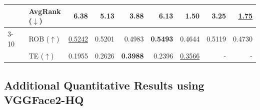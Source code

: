 \documentclass{article}
\begin{document}
\begin{table}[h!]
\begin{tabular}{lllrrrrrrr}
& & AvgRank ($\downarrow$) & 6.38 & 5.13 & 3.88 & 6.13 & \textbf{1.50} & 3.25 & \underline{1.75} \\

\cmidrule(lr){3-10}

& & ROB ($\uparrow$) & \underline{0.5242} & 0.5201 & 0.4983 & \textbf{0.5493} & 0.4644 & 0.5119 & 0.4730 \\
& & TE ($\uparrow$) & 0.1955 & 0.2626 & \textbf{0.3988} & 0.2396 & \underline{0.3566} & - & -\\
\bottomrule
\end{tabular}
\vspace{-10pt}
\end{table}

\clearpage

\subsection{Additional Quantitative Results using VGGFace2-HQ}
\label{appendix:vggface}
\end{document}

